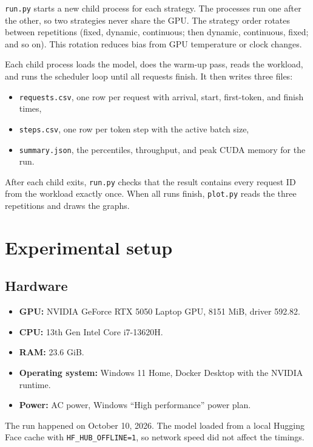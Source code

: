\documentclass[12pt,a4paper]{article}
\begin{document}
\texttt{run.py} starts a new child process for each strategy. The processes run one after the other, so two strategies never share the GPU. The strategy order rotates between repetitions (fixed, dynamic, continuous; then dynamic, continuous, fixed; and so on). This rotation reduces bias from GPU temperature or clock changes.

Each child process loads the model, does the warm-up pass, reads the workload, and runs the scheduler loop until all requests finish. It then writes three files:
\begin{itemize}
    \item \texttt{requests.csv}, one row per request with arrival, start, first-token, and finish times,
    \item \texttt{steps.csv}, one row per token step with the active batch size,
    \item \texttt{summary.json}, the percentiles, throughput, and peak CUDA memory for the run.
\end{itemize}

After each child exits, \texttt{run.py} checks that the result contains every request ID from the workload exactly once. When all runs finish, \texttt{plot.py} reads the three repetitions and draws the graphs.

\section{Experimental setup}

\subsection{Hardware}
\begin{itemize}
    \item \textbf{GPU:} NVIDIA GeForce RTX 5050 Laptop GPU, 8151 MiB, driver 592.82.
    \item \textbf{CPU:} 13th Gen Intel Core i7-13620H.
    \item \textbf{RAM:} 23.6 GiB.
    \item \textbf{Operating system:} Windows 11 Home, Docker Desktop with the NVIDIA runtime.
    \item \textbf{Power:} AC power, Windows ``High performance'' power plan.
\end{itemize}
The run happened on October 10, 2026. The model loaded from a local Hugging Face cache with \texttt{HF\_HUB\_OFFLINE=1}, so network speed did not affect the timings.
\end{document}

